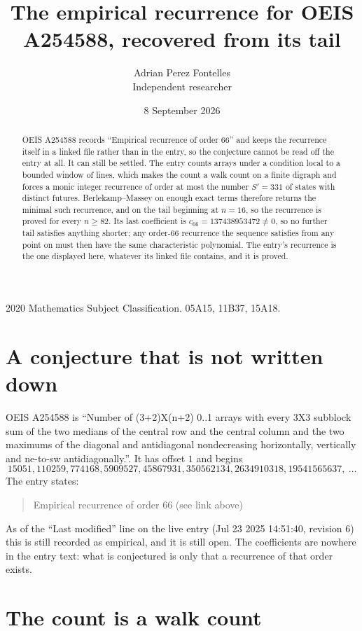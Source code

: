 \documentclass[11pt,a4paper]{article}
\title{The empirical recurrence for OEIS A254588, recovered from its tail}
\author{Adrian Perez Fontelles\\ \small Independent researcher}
\date{8 September 2026}
\theoremstyle{plain}
\theoremstyle{definition}
\begin{document}
\maketitle

\begin{abstract}
OEIS A254588 records ``Empirical recurrence of order $66$'' and keeps the recurrence itself in
a linked file rather than in the entry, so the conjecture cannot be read off the entry at all.
It can still be settled. The entry counts arrays under a condition local to a bounded window of
lines, which makes the count a walk count on a finite digraph and forces a monic integer
recurrence of order at most the number $S'=331$ of states with distinct futures. Berlekamp--Massey on
enough exact terms therefore returns the minimal such recurrence, and on the tail beginning at $n=16$, so the recurrence is proved for every $n\ge82$.
Its last coefficient is $c_{66}=137438953472\neq0$, so no further tail satisfies anything
shorter; any order-$66$ recurrence the sequence satisfies from any point on must then have
the same characteristic polynomial. The entry's recurrence is the one displayed here, whatever
its linked file contains, and it is proved.
\end{abstract}

\noindent\small 2020 Mathematics Subject Classification. 05A15, 11B37, 15A18.\normalsize

\section{A conjecture that is not written down}

OEIS A254588 is ``Number of (3+2)X(n+2) 0..1 arrays with every 3X3 subblock sum of the two medians of the central row and the central column and the two maximums of the diagonal and antidiagonal nondecreasing horizontally, vertically and ne-to-sw antidiagonally.''. It has offset $1$ and begins
\[
15051, 110259, 774168, 5909527, 45867931, 350562134, 2634910318, 19541565637,\ \dots
\]
The entry states:
\begin{quote}
Empirical recurrence of order 66 (see link above)
\end{quote}
As of the ``Last modified'' line on the live entry (Jul 23 2025 14:51:40, revision 6)
this is still recorded as empirical, and it is still open. The coefficients are nowhere in the
entry text: what is conjectured is only that a recurrence of that order exists.

\section{The count is a walk count}
\end{document}
